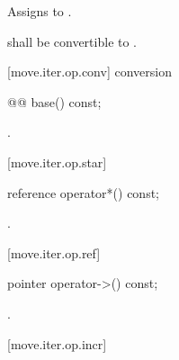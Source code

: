 \begin{itemdescr}
\pnum
\effects Assigns  to
.

\begin{removedblock}
\pnum
\requires {} shall be convertible to
.
\end{removedblock}
\end{itemdescr}

[move.iter.op.conv]{ conversion}

%
%
\begin{itemdecl}
@@ base() const;
\end{itemdecl}

\begin{itemdescr}
\pnum
\returns {}.
\end{itemdescr}

[move.iter.op.star]{}

%
%
\begin{itemdecl}
reference operator*() const;
\end{itemdecl}

\begin{itemdescr}
\pnum
\oldoldtxt{\returns}
.
\end{itemdescr}

\begin{removedblock}
{\color{oldclr}
[move.iter.op.ref]{}

%
%
\begin{itemdecl}
pointer operator->() const;
\end{itemdecl}

\begin{itemdescr}
\pnum
\returns {}.
\end{itemdescr}
} %
\end{removedblock}

[move.iter.op.incr]{}

